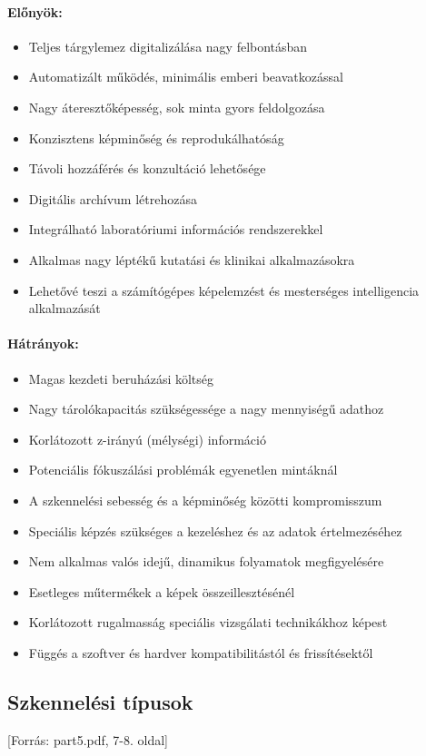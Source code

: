 \documentclass[a4paper,12pt]{article}
\begin{document}
\paragraph{Előnyök:} \begin{itemize} \item Teljes tárgylemez digitalizálása nagy felbontásban \item Automatizált működés, minimális emberi beavatkozással \item Nagy áteresztőképesség, sok minta gyors feldolgozása \item Konzisztens képminőség és reprodukálhatóság \item Távoli hozzáférés és konzultáció lehetősége \item Digitális archívum létrehozása \item Integrálható laboratóriumi információs rendszerekkel \item Alkalmas nagy léptékű kutatási és klinikai alkalmazásokra \item Lehetővé teszi a számítógépes képelemzést és mesterséges intelligencia alkalmazását \end{itemize}

\paragraph{Hátrányok:} \begin{itemize} \item Magas kezdeti beruházási költség \item Nagy tárolókapacitás szükségessége a nagy mennyiségű adathoz \item Korlátozott z-irányú (mélységi) információ \item Potenciális fókuszálási problémák egyenetlen mintáknál \item A szkennelési sebesség és a képminőség közötti kompromisszum \item Speciális képzés szükséges a kezeléshez és az adatok értelmezéséhez \item Nem alkalmas valós idejű, dinamikus folyamatok megfigyelésére \item Esetleges műtermékek a képek összeillesztésénél \item Korlátozott rugalmasság speciális vizsgálati technikákhoz képest \item Függés a szoftver és hardver kompatibilitástól és frissítésektől \end{itemize}

\subsection{Szkennelési típusok} [Forrás: part5.pdf, 7-8. oldal]
\end{document}
